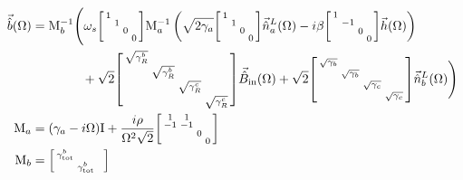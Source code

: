 \begin{align}\label{eq:nIS_vecb}
\vec{\hat{b}}(\Omega)&= \mathrm{M}_b^{-1}\Biggl(\omega_s\begin{bsmallmatrix}
1 &  &  &  \\
 & 1 &  &  \\
 &  & 0 &  \\
 &  &  & 0
\end{bsmallmatrix}\mathrm{M}_a^{-1}\left(\sqrt{2\gamma_a}\begin{bsmallmatrix}
1 &  &  &  \\
 & 1 &  &  \\
 &  & 0 &  \\
 &  &  & 0
\end{bsmallmatrix}\vec{\hat{n}}^L_a(\Omega)-i\beta\begin{bsmallmatrix}
1 &  &  &  \\
 & -1 &  &  \\
 &  & 0 &  \\
 &  &  & 0
\end{bsmallmatrix}\vec{h}(\Omega)\right)\\&\hspace{1.4cm}+ \sqrt{2}\begin{bsmallmatrix}
\sqrt{\gamma^b_R} &  &  &  \\
 & \sqrt{\gamma^b_R} &  &  \\
 &  & \sqrt{\gamma^c_R} &  \\
 &  &  & \sqrt{\gamma^c_R}
\end{bsmallmatrix}\vec{\hat B}_\mathrm{in}(\Omega) + \sqrt{2}\begin{bsmallmatrix}
\sqrt{\gamma_b} &  &  &  \\
 & \sqrt{\gamma_b} &  &  \\
 &  & \sqrt{\gamma_c} &  \\
 &  &  & \sqrt{\gamma_c}
\end{bsmallmatrix}\vec{\hat n}^L_b(\Omega)\Biggr)\nonumber\\
\mathrm{M}_a &= (\gamma_a-i\Omega)\mathrm{I}+\frac{i\rho}{\Omega^2 \sqrt{2}}\begin{bsmallmatrix}
1 & 1 &  &  \\
-1 & -1 &  &  \\
 &  & 0 &  \\
 &  &  & 0
\end{bsmallmatrix}\\
\text{M}_b&=\begin{bsmallmatrix}
\gamma^b_\mathrm{tot} &  &  &  \\
 & \gamma^b_\mathrm{tot} &  &  \\

\end{bsmallmatrix}
\end{align}
